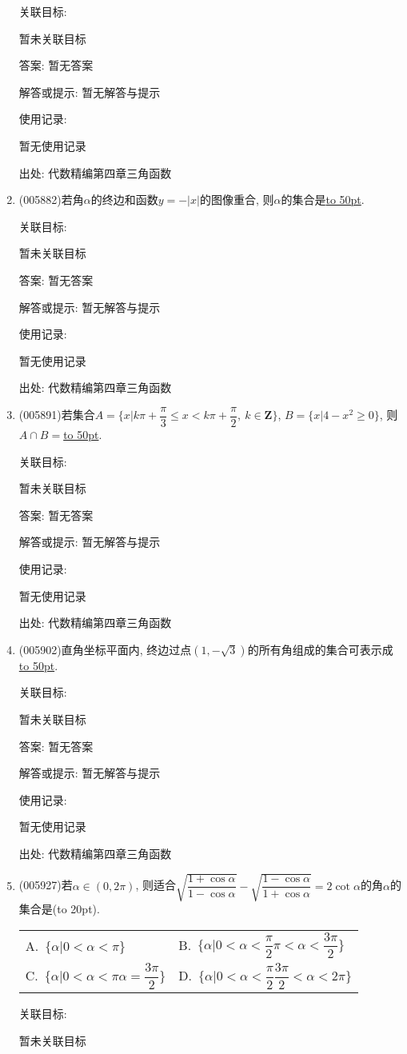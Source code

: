 \documentclass[10pt,a4paper]{article}
\newcommand{\blank}[1]{\underline{\hbox to #1pt{}}}
\newcommand{\bracket}[1]{(\hbox to #1pt{})}
\newcommand{\twoch}[4]{\par\begin{tabular}{p{.46\textwidth}p{.46\textwidth}}
A.~#1& B.~#2\\
C.~#3& D.~#4
\end{tabular}}
\begin{document}
\begin{enumerate}[1.]
关联目标:

暂未关联目标

答案: 暂无答案

解答或提示: 暂无解答与提示

使用记录:

暂无使用记录


出处: 代数精编第四章三角函数
\item { (005882)}若角$\alpha$的终边和函数$y=-|x|$的图像重合, 则$\alpha$的集合是\blank{50}.


关联目标:

暂未关联目标

答案: 暂无答案

解答或提示: 暂无解答与提示

使用记录:

暂无使用记录


出处: 代数精编第四章三角函数
\item { (005891)}若集合$A=\{x|k\pi +\dfrac{\pi}3\le x<k\pi +\dfrac{\pi}2, \ k\in \mathbf{Z}\}$, $B=\{x|4-x^2\ge 0\}$, 则$A\cap B=$\blank{50}.


关联目标:

暂未关联目标

答案: 暂无答案

解答或提示: 暂无解答与提示

使用记录:

暂无使用记录


出处: 代数精编第四章三角函数
\item { (005902)}直角坐标平面内, 终边过点$(1,-\sqrt 3)$的所有角组成的集合可表示成\blank{50}.


关联目标:

暂未关联目标

答案: 暂无答案

解答或提示: 暂无解答与提示

使用记录:

暂无使用记录


出处: 代数精编第四章三角函数
\item { (005927)}若$\alpha \in (0,2\pi)$, 则适合$\sqrt {\dfrac{1+\cos \alpha}{1-\cos \alpha}}-\sqrt {\dfrac{1-\cos \alpha}{1+\cos \alpha}}=2\cot \alpha$的角$\alpha$的集合是\bracket{20}.
\twoch{$\{\alpha|0<\alpha <\pi\}$}{$\{\alpha|0<\alpha <\dfrac{\pi}2\pi <\alpha <\dfrac{3\pi}2\}$}{$\{\alpha|0<\alpha <\pi \alpha =\dfrac{3\pi}2\}$}{$\{\alpha|0<\alpha <\dfrac{\pi}2\dfrac{3\pi}2<\alpha <2\pi\}$}


关联目标:

暂未关联目标


\end{enumerate}
\end{document}
